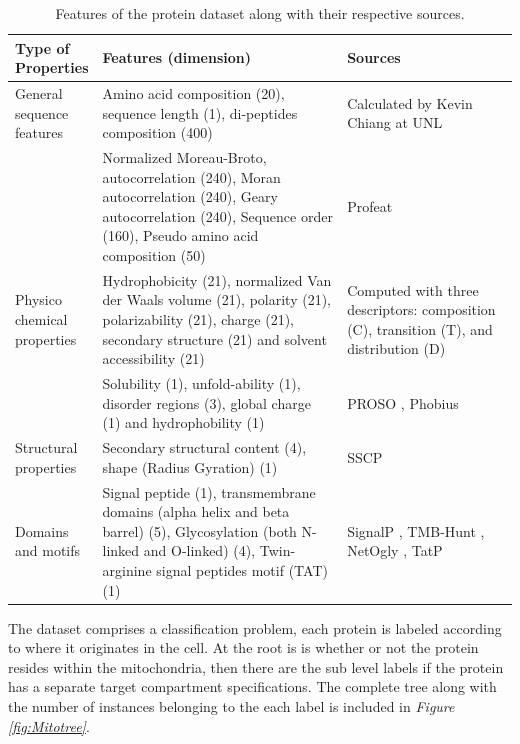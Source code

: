 \documentclass[ms]{nuthesis}
\begin{document}
\FloatBarrier
\begin{table}[H]
  \centering
  \small
  \caption{Features of the protein dataset along with their respective sources.}
  \label{tab:featureList}
  \begin{tabular}{|p{0.15\linewidth}|p{0.5\linewidth}|p{0.35\linewidth}|} \toprule
    Type of Properties & Features (dimension) & Sources \\ \midrule
    General sequence features & Amino acid composition (20), sequence length (1),
     di-peptides composition (400) & Calculated by Kevin Chiang at UNL \cite{bioPoster} \\
     & Normalized Moreau-Broto, autocorrelation
     (240), Moran autocorrelation (240), Geary autocorrelation (240),
     Sequence order (160), Pseudo amino acid composition (50) & Profeat \cite{PROFEAT1} \\ \midrule
    Physico chemical properties &  Hydrophobicity (21), normalized Van der Waals volume (21),
    polarity (21), polarizability (21), charge (21), secondary structure (21)
    and solvent accessibility (21) & Computed with three descriptors: composition (C),
    transition (T), and distribution (D) \cite{Cui2} \\
     & Solubility (1), unfold-ability (1),
    disorder regions (3), global charge (1) and hydrophobility (1) &
    PROSO \cite{PROSO3}, Phobius \cite{Phobius4} \\ \midrule
    Structural properties & Secondary structural content (4), shape
    (Radius Gyration) (1) & SSCP \cite{PSSCP5} \\ \midrule
    Domains and motifs & Signal peptide (1), transmembrane domains
    (alpha helix and beta barrel) (5), Glycosylation
    (both N-linked and O-linked) (4),
    Twin-arginine signal peptides motif (TAT) (1) & SignalP \cite{SignalP6},
    TMB-Hunt \cite{TMBHunt7}, NetOgly \cite{NetOgly8}, TatP \cite{TatP9} \\
      \bottomrule
  \end{tabular}
\end{table}
\FloatBarrier

\par The dataset comprises a classification problem, each protein is labeled
 according to where it originates in the cell. At the root is is whether or not
 the protein resides within the mitochondria, then there are the sub level labels
 if the protein has a separate target compartment specifications. The complete
 tree along with the number of instances belonging to the each label
 is included in \textit{Figure \ref{fig:Mitotree}}.
\end{document}
